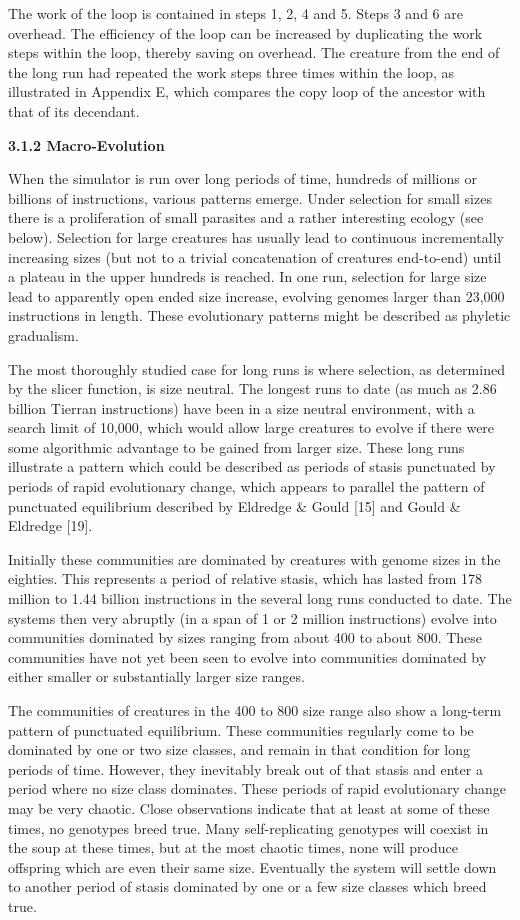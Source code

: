 The work of the loop is contained in steps 1, 2, 4 and 5.  Steps 3 and 6 are
overhead.  The efficiency of the loop can be increased by duplicating the
work steps within the loop, thereby saving on overhead.  The creature from
the end of the long run had repeated the work steps three times within the
loop, as illustrated in Appendix E, which compares the copy loop of the
ancestor with that of its decendant.

\LP
\bf 3.1.2 Macro-Evolution\rm
\eLP

When the simulator is run over long periods of time, hundreds of millions or
billions of instructions, various patterns emerge.  Under selection for small
sizes there is a proliferation of small parasites and a rather interesting
ecology (see below).  Selection for large creatures has usually lead to
continuous incrementally increasing sizes (but not to a trivial concatenation
of creatures end-to-end) until a plateau in the upper hundreds is reached.
In one run, selection for large size lead to apparently open ended size
increase, evolving genomes larger than 23,000 instructions in length.
These evolutionary patterns might be described as phyletic gradualism.

The most thoroughly studied case for long runs is where selection, as
determined by the slicer function, is size neutral.  The longest runs to date
(as much as 2.86 billion Tierran instructions) have been in a size neutral
environment, with a search limit of 10,000, which would allow large creatures
to evolve if there were some algorithmic advantage to be gained from larger
size.  These long runs illustrate a pattern which could be described as
periods of stasis punctuated by periods of rapid evolutionary change, which
appears to parallel the pattern of punctuated equilibrium described by
Eldredge \& Gould [15] and Gould \& Eldredge [19].

Initially these communities are dominated by creatures with genome sizes
in the eighties.  This represents a period of relative stasis, which has
lasted from 178 million to 1.44 billion instructions in the several long
runs conducted to date.  The systems then very abruptly (in a span of 1 or
2 million instructions) evolve into communities dominated by sizes ranging
from about 400 to about 800.  These communities have not yet been seen to
evolve into communities dominated by either smaller or substantially larger
size ranges.

The communities of creatures in the 400 to 800 size range also show a
long-term pattern of punctuated equilibrium.  These communities regularly come
to be dominated by one or two size classes, and remain in that condition for
long periods of time.  However, they inevitably break out of that stasis
and enter a period where no size class dominates.  These periods of rapid
evolutionary change may be very chaotic.  Close observations indicate that
at least at some of these times, no genotypes breed true.  Many
self-replicating genotypes will coexist in the soup at these times, but at
the most chaotic times, none will produce offspring which are even their same
size.  Eventually the system will settle down to another period of stasis
dominated by one or a few size classes which breed true.

